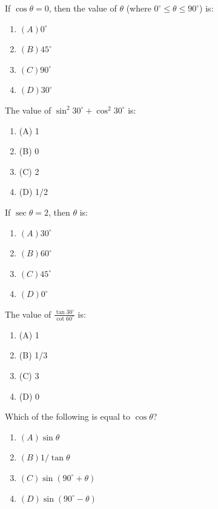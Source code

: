 \documentclass[12pt,a4paper]{exam}
\begin{document}
\begin{questions}
\question[1] If $\cos \theta = 0$, then the value of $\theta$ (where $0^\circ \leq \theta \leq 90^\circ$) is:
\begin{enumerate}[label=(\Alph*)]
  \item $(A) 0^\circ$
  \item $(B) 45^\circ$
  \item $(C) 90^\circ$
  \item $(D) 30^\circ$
\end{enumerate}
\vspace{0.15cm}

\question[1] The value of $\sin^2 30^\circ + \cos^2 30^\circ$ is:
\begin{enumerate}[label=(\Alph*)]
  \item (A) 1
  \item (B) 0
  \item (C) 2
  \item (D) 1/2
\end{enumerate}
\vspace{0.15cm}

\question[1] If $\sec \theta = 2$, then $\theta$ is:
\begin{enumerate}[label=(\Alph*)]
  \item $(A) 30^\circ$
  \item $(B) 60^\circ$
  \item $(C) 45^\circ$
  \item $(D) 0^\circ$
\end{enumerate}
\vspace{0.15cm}

\question[1] The value of $\frac{\tan 30^\circ}{\cot 60^\circ}$ is:
\begin{enumerate}[label=(\Alph*)]
  \item (A) 1
  \item (B) 1/3
  \item (C) 3
  \item (D) 0
\end{enumerate}
\vspace{0.15cm}

\question[1] Which of the following is equal to $\cos \theta$?
\begin{enumerate}[label=(\Alph*)]
  \item $(A) \sin \theta$
  \item $(B) 1/\tan \theta$
  \item $(C) \sin(90^\circ + \theta)$
  \item $(D) \sin(90^\circ - \theta)$
\end{enumerate}
\vspace{0.15cm}


\end{questions}
\end{document}
